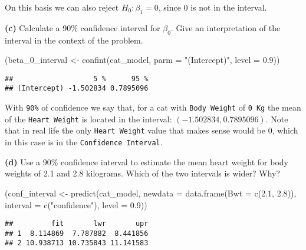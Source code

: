 \documentclass[
]{article}
\newenvironment{Shaded}{\begin{snugshade}}{\end{snugshade}}
\newcommand{\AttributeTok}[1]{\textcolor[rgb]{0.77,0.63,0.00}{#1}}
\newcommand{\FloatTok}[1]{\textcolor[rgb]{0.00,0.00,0.81}{#1}}
\newcommand{\FunctionTok}[1]{\textcolor[rgb]{0.00,0.00,0.00}{#1}}
\newcommand{\NormalTok}[1]{#1}
\newcommand{\OtherTok}[1]{\textcolor[rgb]{0.56,0.35,0.01}{#1}}
\newcommand{\StringTok}[1]{\textcolor[rgb]{0.31,0.60,0.02}{#1}}
\begin{document}
On this basis we can also reject \(H_0: \beta_1 = 0\), since 0 is not in
the interval.

\textbf{(c)} Calculate a 90\% confidence interval for \(\beta_0\). Give
an interpretation of the interval in the context of the problem.

\begin{Shaded}
\begin{Highlighting}[]
\NormalTok{(beta\_0\_interval }\OtherTok{\textless{}{-}} \FunctionTok{confint}\NormalTok{(cat\_model, }\AttributeTok{parm =} \StringTok{"(Intercept)"}\NormalTok{, }\AttributeTok{level =} \FloatTok{0.9}\NormalTok{))}
\end{Highlighting}
\end{Shaded}

\begin{verbatim}
##                   5 %      95 %
## (Intercept) -1.502834 0.7895096
\end{verbatim}

With \texttt{90\%} of confidence we say that, for a cat with
\texttt{Body\ Weight} of \texttt{0\ Kg} the mean of the
\texttt{Heart\ Weight} is located in the interval:
\(\left(-1.502834, 0.7895096\right)\). Note that in real life the only
\texttt{Heart\ Weight} value that makes sense would be 0, which in this
case is in the \texttt{Confidence\ Interval}.

\textbf{(d)} Use a 90\% confidence interval to estimate the mean heart
weight for body weights of 2.1 and 2.8 kilograms. Which of the two
intervals is wider? Why?

\begin{Shaded}
\begin{Highlighting}[]
\NormalTok{(conf\_interval }\OtherTok{\textless{}{-}} \FunctionTok{predict}\NormalTok{(cat\_model, }\AttributeTok{newdata =} \FunctionTok{data.frame}\NormalTok{(}\AttributeTok{Bwt =} \FunctionTok{c}\NormalTok{(}\FloatTok{2.1}\NormalTok{, }\FloatTok{2.8}\NormalTok{)),}
        \AttributeTok{interval =} \FunctionTok{c}\NormalTok{(}\StringTok{"confidence"}\NormalTok{), }\AttributeTok{level =} \FloatTok{0.9}\NormalTok{))}
\end{Highlighting}
\end{Shaded}

\begin{verbatim}
##         fit       lwr       upr
## 1  8.114869  7.787882  8.441856
## 2 10.938713 10.735843 11.141583
\end{verbatim}
\end{document}
